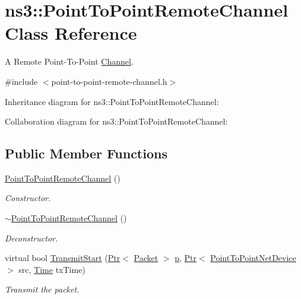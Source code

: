 \hypertarget{classns3_1_1PointToPointRemoteChannel}{}\section{ns3\+:\+:Point\+To\+Point\+Remote\+Channel Class Reference}
\label{classns3_1_1PointToPointRemoteChannel}


A Remote Point-\/\+To-\/\+Point \hyperlink{classns3_1_1Channel}{Channel}.  




{\ttfamily \#include $<$point-\/to-\/point-\/remote-\/channel.\+h$>$}



Inheritance diagram for ns3\+:\+:Point\+To\+Point\+Remote\+Channel\+:


Collaboration diagram for ns3\+:\+:Point\+To\+Point\+Remote\+Channel\+:
\subsection*{Public Member Functions}
\begin{DoxyCompactItemize}
\item 
\hyperlink{classns3_1_1PointToPointRemoteChannel_ac0942db7faba1e299af0a21ca67f0068}{Point\+To\+Point\+Remote\+Channel} ()
\begin{DoxyCompactList}\small\item\em Constructor. \end{DoxyCompactList}\item 
\hyperlink{classns3_1_1PointToPointRemoteChannel_a1c47855bd18f8532cda8eaa1ee4c15bd}{$\sim$\+Point\+To\+Point\+Remote\+Channel} ()
\begin{DoxyCompactList}\small\item\em Deconstructor. \end{DoxyCompactList}\item 
virtual bool \hyperlink{classns3_1_1PointToPointRemoteChannel_adf3cd554e4987c346dff17b536753ffd}{Transmit\+Start} (\hyperlink{classns3_1_1Ptr}{Ptr}$<$ \hyperlink{classns3_1_1Packet}{Packet} $>$ \hyperlink{lte__link__budget__x2__handover__measures_8m_ac9de518908a968428863f829398a4e62}{p}, \hyperlink{classns3_1_1Ptr}{Ptr}$<$ \hyperlink{classns3_1_1PointToPointNetDevice}{Point\+To\+Point\+Net\+Device} $>$ src, \hyperlink{classns3_1_1Time}{Time} tx\+Time)
\begin{DoxyCompactList}\small\item\em Transmit the packet. \end{DoxyCompactList}\end{DoxyCompactItemize}
